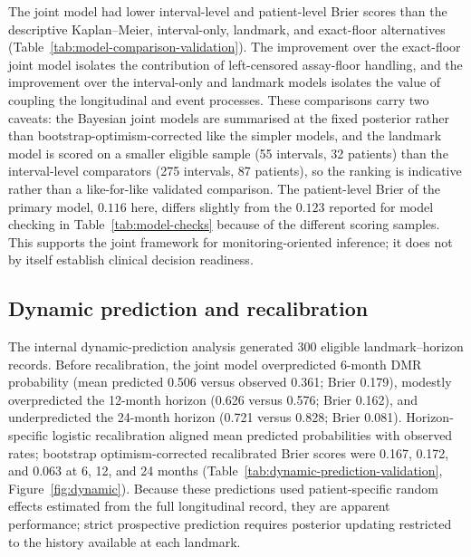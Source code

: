 \documentclass[11pt]{article}
\begin{document}
The joint model had lower interval-level and patient-level Brier scores
than the descriptive Kaplan--Meier, interval-only, landmark, and
exact-floor alternatives (Table~\ref{tab:model-comparison-validation}). The improvement
over the exact-floor joint model isolates the contribution of
left-censored assay-floor handling, and the improvement over the
interval-only and landmark models isolates the value of coupling the
longitudinal and event processes. These comparisons carry two caveats: the
Bayesian joint models are summarised at the fixed posterior rather than
bootstrap-optimism-corrected like the simpler models, and the landmark model
is scored on a smaller eligible sample (55 intervals, 32 patients) than the
interval-level comparators (275 intervals, 87 patients), so the ranking is
indicative rather than a like-for-like validated comparison. The
patient-level Brier of the primary model, $0.116$ here, differs slightly from
the $0.123$ reported for model checking in Table~\ref{tab:model-checks}
because of the different scoring samples. This supports the joint framework
for monitoring-oriented inference; it does not by itself establish clinical
decision readiness.



\subsection{Dynamic prediction and recalibration}

The internal dynamic-prediction analysis generated 300 eligible
landmark--horizon records. Before recalibration, the joint model
overpredicted 6-month DMR probability (mean predicted 0.506 versus
observed 0.361; Brier 0.179), modestly overpredicted the 12-month horizon
(0.626 versus 0.576; Brier 0.162), and underpredicted the 24-month horizon
(0.721 versus 0.828; Brier 0.081). Horizon-specific logistic recalibration
aligned mean predicted probabilities with observed rates; bootstrap
optimism-corrected recalibrated Brier scores were 0.167, 0.172, and 0.063
at 6, 12, and 24 months (Table~\ref{tab:dynamic-prediction-validation},
Figure~\ref{fig:dynamic}). Because these predictions used patient-specific
random effects estimated from the full longitudinal record, they are
apparent performance; strict prospective prediction requires posterior
updating restricted to the history available at each landmark.


\end{document}
